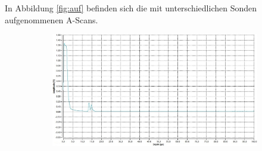 In Abbildung \ref{fig:auf} befinden sich die mit unterschiedlichen Sonden aufgenommenen A-Scans.
\begin{figure}[H]
  \caption{A-Scans mithilfe unterschiedlicher Ultraschallsonden von Loch 1 und 2}
  \label{fig:auf}
  \centering
        \par\bigskip
        \begin{subfigure}[b]{0.69\textwidth}
                \centering
                \includegraphics[width=\textwidth]{Scan-Bilder/aufgruen.jpg}

\end{subfigure}
\end{figure}
